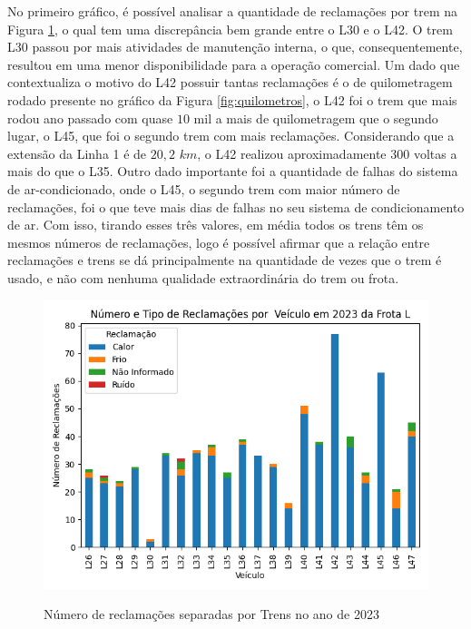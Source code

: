 \documentclass[acronym,symbols,table]{fei}
\begin{document}
No primeiro gráfico, é possível analisar a quantidade de reclamações por trem na Figura \ref{fig:reclamacao_trem}, o qual tem uma discrepância bem grande entre o L30 e o L42. O trem L30 passou por mais  atividades de manutenção interna, o que, consequentemente, resultou em uma  menor disponibilidade para a operação comercial. Um dado que contextualiza o motivo do L42 possuir tantas reclamações é o de quilometragem rodado presente no gráfico da Figura \ref{fig:quilometros}, o L42 foi o trem que mais rodou ano passado com quase $10$ mil a mais de quilometragem que o segundo lugar, o L45, que foi o segundo trem com mais reclamações. Considerando que a extensão da Linha 1 é de $20,2$ $km$, o L42 realizou aproximadamente 300 voltas a mais do que o L35. Outro dado importante foi a quantidade de falhas do sistema de ar-condicionado, onde o L45, o segundo trem com maior número de reclamações, foi o que teve mais dias de falhas no seu sistema de condicionamento de ar. Com isso, tirando esses três valores, em média todos os trens têm os mesmos números de reclamações, logo é possível afirmar que a relação entre reclamações e trens se dá principalmente na quantidade de vezes que o trem é usado, e não com nenhuma qualidade extraordinária do trem ou frota.

\begin{figure}[!htb]
    \centering
    \caption{Número de reclamações separadas por Trens no ano de 2023}
    \includegraphics[width=0.8\linewidth]{Imagens/reclamacao_trem.png}
    \label{fig:reclamacao_trem}
\end{figure}
\end{document}
